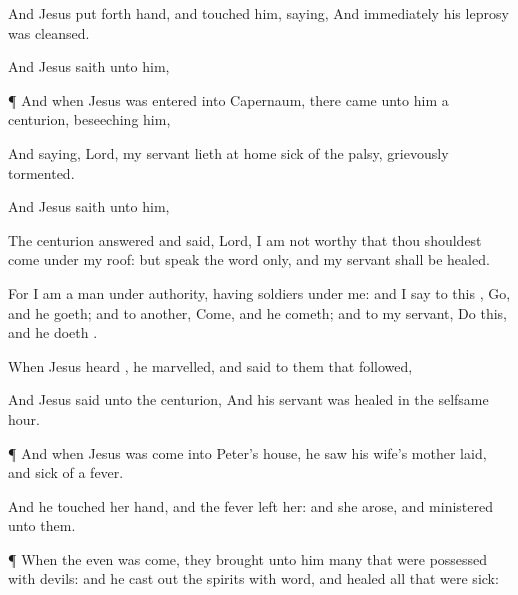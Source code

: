 {And
Jesus put
forth
{}
hand, and
touched
him,
saying,
{}
And
immediately
his
leprosy was
cleansed.

And
Jesus
saith unto
him,
{}


\par }{\PP {}¶
And
when
Jesus was
entered
into
Capernaum, there
came unto
him a
centurion,
beseeching
him,

And
saying,
Lord,
my
servant
lieth
at
home sick of the
palsy,
grievously
tormented.

And
Jesus
saith unto
him,
{}

The
centurion
answered
and
said,
Lord, I
am
not
worthy
that thou shouldest
come
under
my
roof:
but
speak the
word
only,
and
my
servant shall be
healed.

For
I
am a
man
under
authority,
having
soldiers
under
me:
and I
say to
this
{},
Go,
and he
goeth;
and to
another,
Come,
and he
cometh;
and
to
my
servant,
Do
this,
and he
doeth
{}.

When
Jesus
heard
{}, he
marvelled,
and
said to them that
followed,
{}



And
Jesus
said unto the
centurion,
{}
And
his
servant
was healed
in
the
selfsame
hour.


\par }{\PP {}¶
And
when
Jesus was
come
into
Peter’s
house, he
saw
his
wife’s mother
laid,
and sick of a
fever.

And he
touched
her
hand,
and the
fever
left
her:
and she
arose,
and
ministered unto
them.


\par }{\PP {}¶
When the
even was
come, they
brought unto
him
many that were possessed with
devils:
and he cast
out the
spirits
with
{}
word,
and
healed
all that
were
sick:

}
